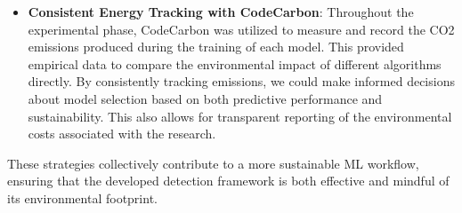 \documentclass[conference]{IEEEtran}
\begin{document}
\begin{itemize}
    \item \textbf{Consistent Energy Tracking with CodeCarbon}: Throughout the experimental phase, CodeCarbon \cite{b13} was utilized to measure and record the CO2 emissions produced during the training of each model. This provided empirical data to compare the environmental impact of different algorithms directly. By consistently tracking emissions, we could make informed decisions about model selection based on both predictive performance and sustainability. This also allows for transparent reporting of the environmental costs associated with the research.
\end{itemize}
These strategies collectively contribute to a more sustainable ML workflow, ensuring that the developed detection framework is both effective and mindful of its environmental footprint.
\end{document}
